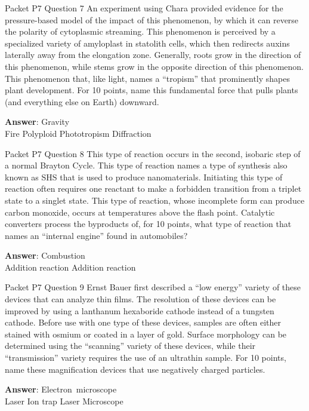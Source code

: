 \begin{frame}{Packet P7 Question 7}
An experiment using Chara provided evidence for the pressure-based model of the impact of this phenomenon, by which it can reverse the polarity of cytoplasmic streaming. This phenomenon is perceived by a specialized variety of amyloplast in statolith cells, which then redirects auxins laterally away from the elongation zone. Generally, roots grow in the direction of this phenomenon, while stems grow in the opposite direction of this phenomenon. This phenomenon that, like light, names a “tropism” that prominently shapes plant development. For 10 points, name this fundamental force that pulls plants (and everything else on Earth) downward.        

\textbf{Answer}: Gravity\\
 Fire
 Polyploid
 Phototropism
 Diffraction
\end{frame}

\begin{frame}{Packet P7 Question 8}
This type of reaction occurs in the second, isobaric step of a normal Brayton Cycle. This type of reaction names a type of synthesis also known as SHS that is used to produce nanomaterials. Initiating this type of reaction often requires one reactant to make a forbidden transition from a triplet state to a singlet state.       This type of reaction, whose incomplete form can produce carbon monoxide, occurs at temperatures above the flash point. Catalytic converters process the byproducts   of, for 10 points, what type of reaction that names an “internal engine” found in automobiles?  

\textbf{Answer}: Combustion\\
 Addition reaction
 Addition reaction
\end{frame}

\begin{frame}{Packet P7 Question 9}
Ernst Bauer first described a “low energy” variety of these devices that can analyze thin films. The resolution of these devices can be improved by using a lanthanum hexaboride cathode instead of a tungsten cathode. Before use with one type of these devices, samples   are often either stained with osmium or coated in a layer of gold. Surface morphology can be determined using the “scanning” variety of these devices, while their “transmission” variety requires the use of an ultrathin sample. For 10 points,   name these magnification devices that use negatively charged particles.      

\textbf{Answer}: Electron\ microscope\\
 Laser
 Ion trap
 Laser
 Microscope
\end{frame}

